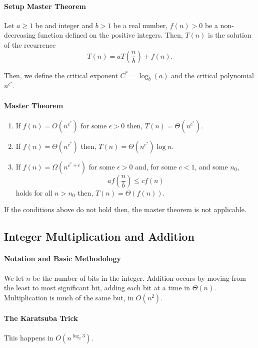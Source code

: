 \paragraph{Setup Master Theorem}
Let \(a \geq 1\)  be and integer and \(b > 1\) be a real number,
\(f(n) > 0\) be a non-decreasing function defined on the positive integers.
Then, \(T(n)\) is the solution of the recurrence
\[
    T(n) = a T\left( \frac{n}{b} \right) + f(n).
\]

Then, we define the critical exponent \(C^* = \log_b(a)\) 
and the critical polynomial \(n^{c^*}\).

\paragraph{Master Theorem}
\begin{enumerate}
    \item If \(f(n) = O(n^{c^*})\) for some \(\epsilon > 0\) then,
    \(T(n) = \Theta(n^{c^*})\).
    \item If \(f(n) = \Theta(n^{c^*})\) then,
    \(T(n) = \Theta (n^{c^*})\log n\).
    \item  If \(f(n) = \Omega(n^{c^* + \epsilon})\) for some \(\epsilon > 0\)
    and, for some \(c < 1\), and some \(n_0\),
    \[a f(\frac{n}{b}) \leq c f(n)\]
    holds for all \(n > n_0\) then, \(T(n) = \Theta(f(n))\).
\end{enumerate}

If the conditions above do not hold then, the master theorem is not
applicable.

\subsection{Integer Multiplication and Addition}

\paragraph{Notation and Basic Methodology}
We let \(n\) be the number of bits in the integer.
Addition occurs by moving from the least to most significant bit, adding each
bit at a time in \(\Theta (n)\). Multiplication is much of the same but,
in \(O(n^2)\).

\paragraph{The Karatsuba Trick}
This happens in \(O(n^{\log_2 3})\).


